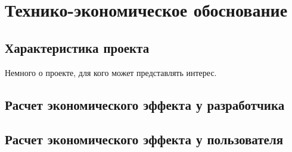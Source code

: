 \section{Технико-экономическое обоснование}

\subsection{Характеристика проекта}
Немного о проекте, для кого может представлять интерес.

\subsection{Расчет экономического эффекта у разработчика}

\subsection{Расчет экономического эффекта у пользователя}
\newpage
